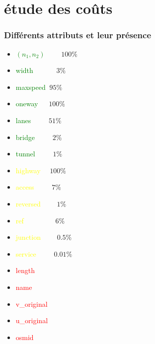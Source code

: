 \documentclass[aspectratio=169]{beamer}
\begin{document}
    \section{étude des coûts}
    \begin{frame}
        \frametitle{Différents attributs et leur présence}
        \begin{multicols}{2}
            \begin{itemize}
                \item \textcolor{green}{$(n_1, n_2)$} $\qquad 100\%$
                \item \textcolor{green}{width} $\qquad\quad 3\%$ 
                \item \textcolor{green}{maxspeed} $\ 95\%$
                \item \textcolor{green}{oneway} $\quad\ 100\%$
                \item \textcolor{green}{lanes} $\qquad\ 51\%$
                \item \textcolor{green}{bridge} $\qquad\ 2\%$
                \item \textcolor{green}{tunnel} $\qquad\ 1\%$
                \item \textcolor{yellow}{highway} $\quad 100\%$
                \item \textcolor{yellow}{access}  $\qquad\ 7\%$
            \end{itemize}
            \vfill\null
            \columnbreak
            \begin{itemize}
                \item \textcolor{yellow}{reversed} $\qquad 1\%$
                \item \textcolor{yellow}{ref} $\qquad\qquad\ 6\%$
                \item \textcolor{yellow}{junction} $\qquad 0.5\%$
                \item \textcolor{yellow}{service} $\qquad\ 0.01\%$
                \item \textcolor{red}{length}
                \item \textcolor{red}{name}
                \item \textcolor{red}{v\_original}
                \item \textcolor{red}{u\_original}
                \item \textcolor{red}{osmid}
            \end{itemize}
            \vfill\null
        \end{multicols}
    \end{frame}
\end{document}
